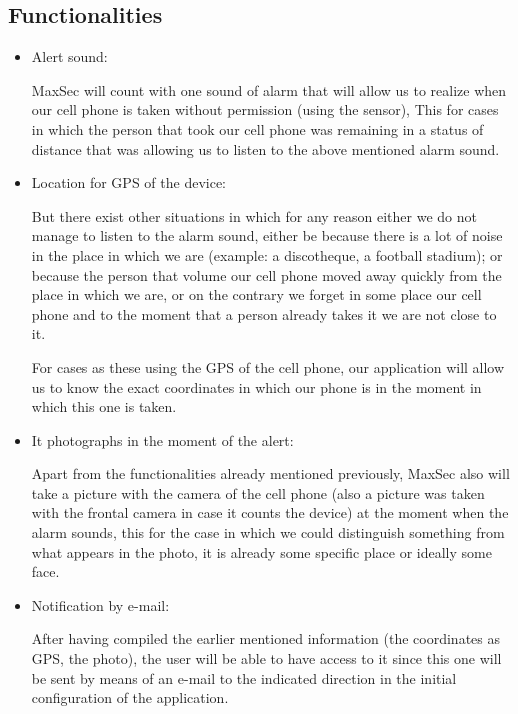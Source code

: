 \documentclass[12pt,letterpaper]{article}
\begin{document}
   \subsection{Functionalities}
   \begin{itemize}
   \item Alert sound:
   
   MaxSec will count with one sound of alarm that will allow us to realize when our cell phone is taken without permission (using the sensor), This for cases in which the person that took our cell phone was remaining in a status of distance that was allowing us to listen to the above mentioned alarm sound.
   
   \item Location for GPS of the device:
   
   But there exist other situations in which for any reason either we do not manage to listen to the alarm sound, either be because there is a lot of noise in the place in which we are (example: a discotheque, a football stadium); or because the person that volume our cell phone moved away quickly from the place in which we are, or on the contrary we forget in some place our cell phone and to the moment that a person already takes it we are not close to it.
   
   For cases as these using the GPS of the cell phone, our application will allow us to know the exact coordinates in which our phone is in the moment in which this one is taken.
   
   \item It photographs in the moment of the alert:
   
   Apart from the functionalities already mentioned previously, MaxSec also will take a picture with the camera of the cell phone (also a picture was taken with the frontal camera in case it counts the device) at the moment when the alarm sounds, this for the case in which we could distinguish something from what appears in the photo, it is already some specific place or ideally some face.
   \newpage
   \item Notification by e-mail:
   
   After having compiled the earlier mentioned information (the coordinates as GPS, the photo), the user will be able to have access to it since this one will be sent by means of an e-mail to the indicated direction in the initial configuration of the application.
   
    
   \end{itemize}
   
\end{document}
